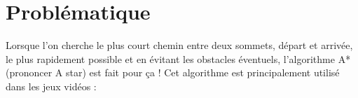 \renewcommand{\cache}[1]{\phantomchoix{#1}\hspace*{0.1mm}}

\usepackage{algorithm}
\usepackage{algorithmic}
\renewcommand{\algorithmicrequire} {\textbf{\textsc{Entrées:}}}
\renewcommand{\algorithmicensure}  {\textbf{\textsc{Sorties:}}}
\renewcommand{\algorithmicwhile}   {\textbf{tantque}}
\renewcommand{\algorithmicdo}      {\textbf{faire}}
\renewcommand{\algorithmicendwhile}{\textbf{fin tantque}}
\renewcommand{\algorithmicend}     {\textbf{fin}}
\renewcommand{\algorithmicif}      {\textbf{si}}
\renewcommand{\algorithmicendif}   {\textbf{finsi}}
\renewcommand{\algorithmicelse}    {\textbf{sinon}}
\renewcommand{\algorithmicthen}    {\textbf{alors}}
\renewcommand{\algorithmicfor}     {\textbf{pour}}
\renewcommand{\algorithmicforall}  {\textbf{pour tout}}
\renewcommand{\algorithmicdo}      {\textbf{faire}}
\renewcommand{\algorithmicendfor}  {\textbf{fin pour}}
\renewcommand{\algorithmicloop}    {\textbf{boucler}}
\renewcommand{\algorithmicendloop} {\textbf{fin boucle}}
\renewcommand{\algorithmicrepeat}  {\textbf{répéter}}
\renewcommand{\algorithmicuntil}   {\textbf{jusqu'à}}


\let\mylistof\listof
\renewcommand\listof[2]{\mylistof{algorithm}{Liste des algorithmes}}

\makeatletter
\providecommand*{\toclevel@algorithm}{0}
\makeatother


\entetecoursinfo







\section{Problématique}

Lorsque l'on cherche le plus court chemin entre deux sommets, départ et arrivée, le plus rapidement possible et en évitant les obstacles éventuels, l'algorithme A* (prononcer A star) est fait pour ça ! Cet algorithme est principalement utilisé dans les jeux vidéos :


